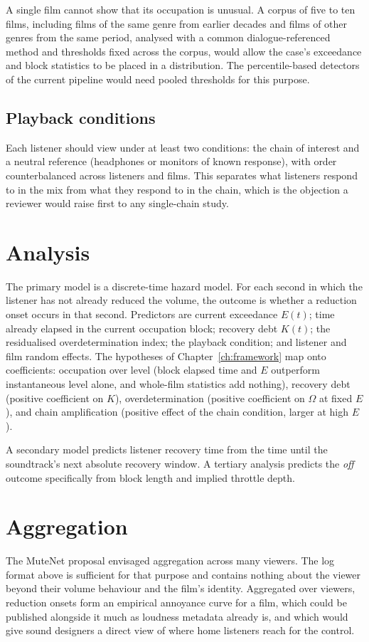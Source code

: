 A single film cannot show that its occupation is unusual. A corpus of five to ten films, including films of the same genre from earlier decades and films of other genres from the same period, analysed with a common dialogue-referenced method and thresholds fixed across the corpus, would allow the case's exceedance and block statistics to be placed in a distribution. The percentile-based detectors of the current pipeline would need pooled thresholds for this purpose.

\subsection{Playback conditions}

Each listener should view under at least two conditions: the chain of interest and a neutral reference (headphones or monitors of known response), with order counterbalanced across listeners and films. This separates what listeners respond to in the mix from what they respond to in the chain, which is the objection a reviewer would raise first to any single-chain study.

\section{Analysis}

The primary model is a discrete-time hazard model. For each second in which the listener has not already reduced the volume, the outcome is whether a reduction onset occurs in that second. Predictors are current exceedance $E(t)$; time already elapsed in the current occupation block; recovery debt $K(t)$; the residualised overdetermination index; the playback condition; and listener and film random effects. The hypotheses of Chapter~\ref{ch:framework} map onto coefficients: occupation over level (block elapsed time and $E$ outperform instantaneous level alone, and whole-film statistics add nothing), recovery debt (positive coefficient on $K$), overdetermination (positive coefficient on $\Omega$ at fixed $E$), and chain amplification (positive effect of the chain condition, larger at high $E$).

A secondary model predicts listener recovery time from the time until the soundtrack's next absolute recovery window. A tertiary analysis predicts the \emph{off} outcome specifically from block length and implied throttle depth.

\section{Aggregation}

The MuteNet proposal envisaged aggregation across many viewers. The log format above is sufficient for that purpose and contains nothing about the viewer beyond their volume behaviour and the film's identity. Aggregated over viewers, reduction onsets form an empirical annoyance curve for a film, which could be published alongside it much as loudness metadata already is, and which would give sound designers a direct view of where home listeners reach for the control.
